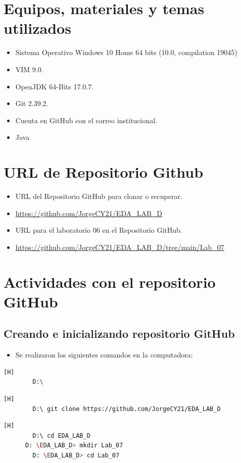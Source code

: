 \documentclass{article}
\begin{document}
		
	\section{Equipos, materiales y temas utilizados}
	\begin{itemize}
		\item Sistema Operativo Windows 10 Home 64 bits (10.0, compilation 19045)
		\item VIM 9.0.
		\item OpenJDK 64-Bits 17.0.7.
		\item Git 2.39.2.
		\item Cuenta en GitHub con el correo institucional.
		\item Java 
	\end{itemize}
	
	\section{URL de Repositorio Github}
	\begin{itemize}
		\item URL del Repositorio GitHub para clonar o recuperar.
		\item \url{https://github.com/JorgeCY21/EDA_LAB_D}
		\item URL para el laboratorio 06 en el Repositorio GitHub.
		\item \url{https://github.com/JorgeCY21/EDA_LAB_D/tree/main/Lab_07}
	\end{itemize}
	
	\section{Actividades con el repositorio GitHub}
	
	\subsection{Creando e inicializando repositorio GitHub}
	\begin{itemize}
		\item Se realizaron los siguientes comandos en la computadora:
	\end{itemize}	
		
	\begin{lstlisting}[language=bash,caption={Dirijíéndonos al directorio de trabajo}][H]
		D:\
	\end{lstlisting}	
	\begin{lstlisting}[language=bash,caption={Clonando repositorio GitHub}][H]
		D:\ git clone https://github.com/JorgeCY21/EDA_LAB_D
	\end{lstlisting}
	\begin{lstlisting}[language=bash,caption={Inicializando directorio para laboratorio 06}][H]
		D:\ cd EDA_LAB_D
      D: \EDA_LAB_D> mkdir Lab_07
		D: \EDA_LAB_D> cd Lab_07
	\end{lstlisting}
	
\end{document}
